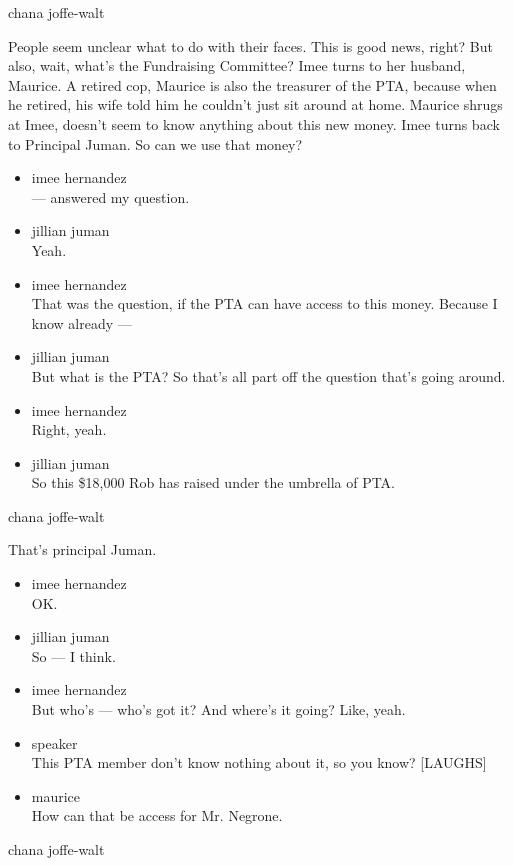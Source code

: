 chana joffe-walt

People seem unclear what to do with their faces. This is good news,
right? But also, wait, what's the Fundraising Committee? Imee turns to
her husband, Maurice. A retired cop, Maurice is also the treasurer of
the PTA, because when he retired, his wife told him he couldn't just sit
around at home. Maurice shrugs at Imee, doesn't seem to know anything
about this new money. Imee turns back to Principal Juman. So can we use
that money?

\begin{itemize}
\item
  imee hernandez\\
  --- answered my question.
\item
  jillian juman\\
  Yeah.
\item
  imee hernandez\\
  That was the question, if the PTA can have access to this money.
  Because I know already ---
\item
  jillian juman\\
  But what is the PTA? So that's all part off the question that's going
  around.
\item
  imee hernandez\\
  Right, yeah.
\item
  jillian juman\\
  So this \$18,000 Rob has raised under the umbrella of PTA.
\end{itemize}

chana joffe-walt

That's principal Juman.

\begin{itemize}
\item
  imee hernandez\\
  OK.
\item
  jillian juman\\
  So --- I think.
\item
  imee hernandez\\
  But who's --- who's got it? And where's it going? Like, yeah.
\item
  speaker\\
  This PTA member don't know nothing about it, so you know? {[}LAUGHS{]}
\item
  maurice\\
  How can that be access for Mr. Negrone.
\end{itemize}

chana joffe-walt

